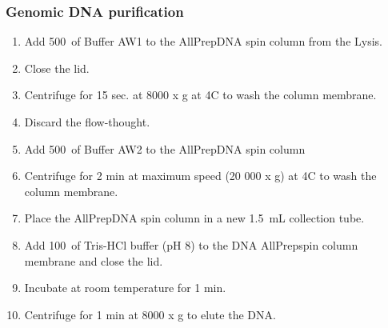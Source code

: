 \subsubsection{Genomic DNA purification}

\begin{enumerate}
\item Add 500~\uL of Buffer AW1 to the AllPrep\cR DNA spin column from the Lysis.
\item Close the lid.
\item Centrifuge for 15 sec. at 8000 x g at 4\degree C to wash the column membrane.
\item Discard the flow-thought.
\item Add 500~\uL of Buffer AW2 to the AllPrep\cR DNA spin column
\item Centrifuge for 2 min at maximum speed (20 000 x g) at 4\degree C to wash the column membrane.
\item Place the AllPrep\cR DNA spin column in a new 1.5~mL collection tube.
\item Add 100~\uL of Tris-HCl buffer (pH 8) to the DNA AllPrep\cR spin column membrane and close the lid.
\item Incubate at room temperature for 1 min.
\item Centrifuge for 1 min at 8000 x g to elute the DNA.
\end{enumerate}
